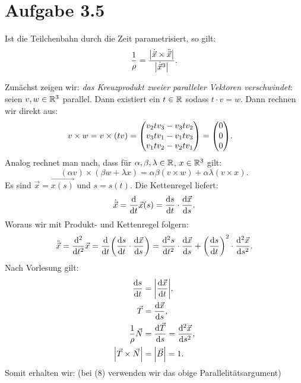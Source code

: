 \documentclass{theozettel}
\begin{document}
\newpage
\section*{Aufgabe 3.5} 
Ist die Teilchenbahn durch die Zeit parametrisiert, so gilt:
	\[
		\frac{1}{\rho} = \frac{\qty| \dot{\vec{x}} \times \ddot{\vec{x}} |}{\qty| \dot{\vec{x}}^{3} |}.
	\]

Zunächst zeigen wir: \textit{das Kreuzprodukt zweier paralleler Vektoren verschwindet}: seien $v,w \in \mathbb{R}^{3}$ parallel. Dann existiert ein $t \in \mathbb{R}$ sodass $t \cdot v = w$. Dann rechnen wir direkt aus:
	\begin{align*}
		v \times w &= v \times (tv) = \mqty(v_{2}tv_{3} - v_{3}tv_{2} \\ v_{3}tv_{1} - v_{1}tv_{3} \\ v_{1}tv_{2} - v_{2}tv_{1} ) = \mqty(0 \\ 0 \\ 0).
	\end{align*}
Analog rechnet man nach, dass für $\alpha, \beta, \lambda \in \mathbb{R}$, $x \in \mathbb{R}^{3}$ gilt:
	\begin{equation}
		(\alpha v) \times (\beta w + \lambda x) = \alpha \beta (v \times w) + \alpha \lambda (v \times x).
	\end{equation}
Es sind $\vec{x} = \vec{x(s)}$ und $s = s(t)$. Die Kettenregel liefert:
	\begin{equation}
		\dot{\vec{x}} = \dv{t} \vec{x}(s) = \dv{s}{t} \cdot \dv{\vec{x}}{s}.
	\end{equation}
Woraus wir mit Produkt- und Kettenregel folgern:
	\begin{equation}
		\ddot{\vec{x}} = \dv[2]{t} \vec{x} = \dv{t} \qty( \dv{s}{t} \cdot \dv{\vec{x}}{s} ) = \dv[2]{s}{t} \cdot \dv{\vec{x}}{s} + \qty( \dv{s}{t} )^{2} \cdot \dv[2]{\vec{x}}{s}.
	\end{equation}
Nach Vorlesung gilt:
	\begin{align}
		\dv{s}{t} &= \qty| \dv{\vec{x}}{t} |, \\
		\vec{T} &= \dv{\vec{x}}{s}, \\
		\frac{1}{\rho} \vec{N} &= \dv{\vec{T}}{s} = \dv[2]{\vec{x}}{s}, \\
		\qty| \vec{T} \times \vec{N} | &= \qty| \vec{B} | = 1.
	\end{align}	
Somit erhalten wir: (bei (8) verwenden wir das obige Parallelitätsargument)
\end{document}
